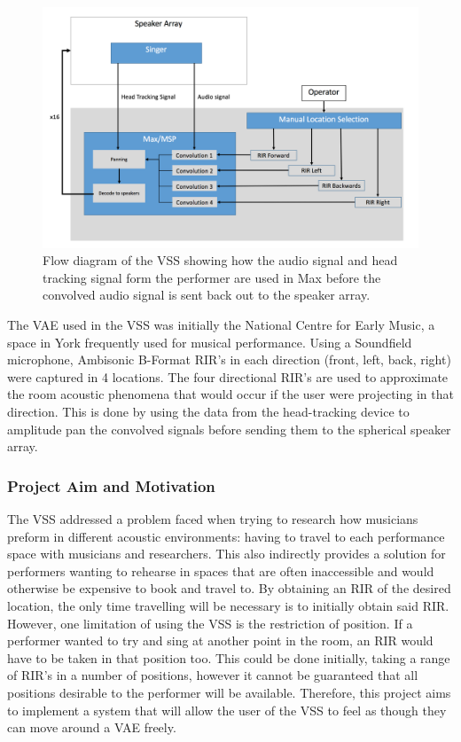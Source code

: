 \documentclass[../../main.tex]{subfiles}
\begin{document}
	
		\begin{figure}[H]
			\centerline{\includegraphics[scale = 0.45]{Sections/Background/images/vssDiagram.png}}
			\caption{Flow diagram of the VSS showing how the audio signal and head tracking signal form the performer are used in Max before the convolved audio signal is sent back out to the speaker array.}
			\label{vssDiagram}
		\end{figure}

		The \ac{VAE} used in the \ac{VSS} was initially the National Centre for Early Music, a space in York frequently used for musical performance. Using a Soundfield microphone, Ambisonic B-Format \ac{RIR}'s in each direction (front, left, back, right) were captured in 4 locations. The four directional \ac{RIR}'s are used to approximate the room acoustic phenomena that would occur if the user were projecting in that direction. This is done by using the data from the head-tracking device to amplitude pan the convolved signals before sending them to the spherical speaker array.


	\subsubsection{Project Aim and Motivation}
		
		The \ac{VSS} addressed a problem faced when trying to research how musicians preform in different acoustic environments: having to travel to each performance space with musicians and researchers. This also indirectly provides a solution for performers wanting to rehearse in spaces that are often inaccessible and would otherwise be expensive to book and travel to. By obtaining an \ac{RIR} of the desired location, the only time travelling will be necessary is to initially obtain said \ac{RIR}. However, one limitation of using the \ac{VSS} is the restriction of position. If a performer wanted to try and sing at another point in the room, an \ac{RIR} would have to be taken in that position too. This could be done initially, taking a range of \ac{RIR}'s in a number of positions, however it cannot be guaranteed that all positions desirable to the performer will be available. Therefore, this project aims to implement a system that will allow the user of the \ac{VSS} to feel as though they can move around a \ac{VAE} freely.
\end{document}
